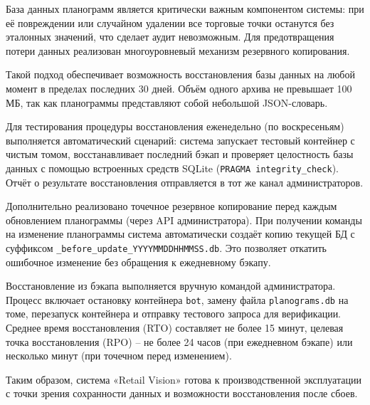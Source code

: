{\gostFont

	\par \redline База данных планограмм является критически важным компонентом системы: при её повреждении или случайном удалении все торговые точки останутся без эталонных значений, что сделает аудит невозможным.
	Для предотвращения потери данных реализован многоуровневый механизм резервного копирования.

	\par \redline Такой подход обеспечивает возможность восстановления базы данных на любой момент в пределах последних 30 дней.
	Объём одного архива не превышает 100 МБ, так как планограммы представляют собой небольшой JSON-словарь.
	\par \redline Для тестирования процедуры восстановления еженедельно (по воскресеньям) выполняется автоматический сценарий: система запускает тестовый контейнер с чистым томом, восстанавливает последний бэкап и проверяет целостность базы данных с помощью встроенных средств SQLite (\texttt{PRAGMA integrity\_check}).
	Отчёт о результате восстановления отправляется в тот же канал администраторов.
	\par \redline Дополнительно реализовано точечное резервное копирование перед каждым обновлением планограммы (через API администратора).
	При получении команды на изменение планограммы система автоматически создаёт копию текущей БД с суффиксом \texttt{\_before\_update\_YYYYMMDDHHMMSS.db}.
	Это позволяет откатить ошибочное изменение без обращения к ежедневному бэкапу.

	\par \redline Восстановление из бэкапа выполняется вручную командой администратора.
	Процесс включает остановку контейнера \texttt{bot}, замену файла \texttt{planograms.db} на томе, перезапуск контейнера и отправку тестового запроса для верификации.
	Среднее время восстановления (RTO) составляет не более 15 минут, целевая точка восстановления (RPO) {--} не более 24 часов (при ежедневном бэкапе) или несколько минут (при точечном перед изменением).
	\par \redline Таким образом, система «Retail Vision» готова к производственной эксплуатации с точки зрения сохранности данных и возможности восстановления после сбоев.
	\par
}

